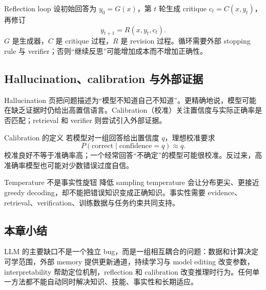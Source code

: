 \begin{importantbox}{Reflection loop}
设初始回答为 $y_0=G(x)$，第 $t$ 轮生成 critique $c_t=C(x,y_t)$，再修订
\[
y_{t+1}=R(x,y_t,c_t).
\]
$G$ 是生成器，$C$ 是 critique 过程，$R$ 是 revision 过程。循环需要外部 stopping rule 与 verifier；否则“继续反思”可能增加成本而不增加正确性。
\end{importantbox}

\subsection{Hallucination、calibration 与外部证据}

Hallucination 页把问题描述为“模型不知道自己不知道”。更精确地说，模型可能在缺乏证据时仍给出高置信语言。Calibration（校准）关注置信度与实际正确率是否匹配；retrieval 和 verifier 则尝试引入外部证据。


\begin{importantbox}{Calibration 的定义}
若模型对一组回答给出置信度 $q$，理想校准要求
\[
P(\text{correct}\mid \text{confidence}=q)\approx q.
\]
校准良好不等于准确率高；一个经常回答“不确定”的模型可能很校准。反过来，高准确率模型也可能对少数错误过度自信。
\end{importantbox}

\begin{warningbox}{Temperature 不是事实性旋钮}
降低 sampling temperature 会让分布更尖、更接近 greedy decoding，却不能把错误知识变成正确知识。事实性需要 evidence、retrieval、verification、训练数据与任务约束共同支持。
\end{warningbox}

\subsection{本章小结}

LLM 的主要缺口不是一个独立 bug，而是一组相互耦合的问题：数据和计算决定可学范围，外部 memory 提供更新通道，持续学习与 model editing 改变参数，interpretability 帮助定位机制，reflection 和 calibration 改变推理时行为。任何单一方法都不能自动同时解决知识、技能、事实性和长期适应。

